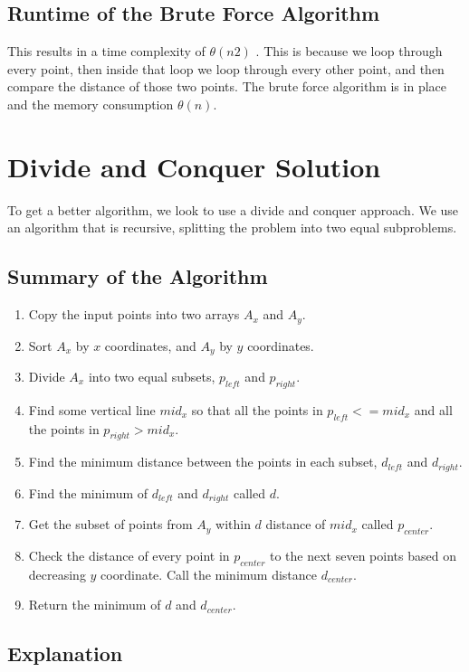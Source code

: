 \documentclass[12pt]{report}
\begin{document}
\subsection*{Runtime of the Brute Force Algorithm}

This results in a time complexity of $\theta{(n2)}$ . This is because we loop through every point, then inside 
that loop we loop through every other point, and then compare the distance of those two points. The 
brute force algorithm is in place and the memory consumption $\theta{(n)}$.


\section*{Divide and Conquer Solution}

To get a better algorithm, we look to use a divide and conquer approach. We use an algorithm that is recursive, splitting the problem into two equal subproblems.

\subsection*{Summary of the Algorithm}

\begin{enumerate}
 \item Copy the input points into two arrays $A_x$ and $A_y$.
 \item Sort $A_x$ by $x$ coordinates, and $A_y$ by $y$ coordinates.
 \item Divide $A_x$ into two equal subsets, $p_{left}$ and $p_{right}$.
 \item Find some vertical line $mid_x$ so that all the points in $p_{left} <= mid_x$ and all the points in $p_{right} > mid_x$.
 \item Find the minimum distance between the points in each subset, $d_{left}$ and $d_{right}$.
 \item Find the minimum of $d_{left}$ and $d_{right}$ called $d$.
 \item Get the subset of points from $A_y$ within $d$ distance of $mid_x$ called $p_{center}$.
 \item Check the distance of every point in $p_{center}$ to the next seven points based on decreasing $y$ coordinate. Call the minimum distance $d_{center}$.
 \item Return the minimum of $d$ and $d_{center}$.
\end{enumerate}

\subsection*{Explanation}
\end{document}
